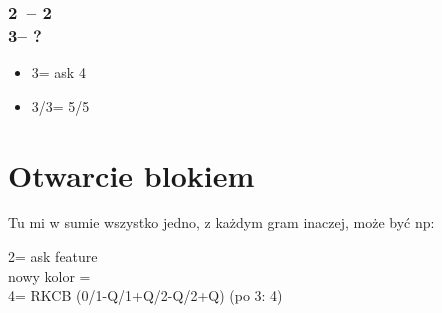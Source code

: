 \documentclass[12pt, a4paper]{report}
\begin{document}
{    \subsubsection*{2\clubs\ -- 2\\
                3\clubs -- ?}
    \begin{itemize}
        \item 3\diams = ask 4\major
        \item 3\hearts/3\spades = 5\hearts/5\spades
    \end{itemize}
}

\section*{\colorbox{blue!30}{Otwarcie blokiem}}
 {
    Tu mi w sumie wszystko jedno, z każdym gram inaczej, może być np:

    2\nt = ask \nt feature \invp\\
    nowy kolor = \fonce\\
    4\clubs = RKCB (0/1-Q/1+Q/2-Q/2+Q) (po 3\clubs : 4\diams) \\
}
\end{document}
